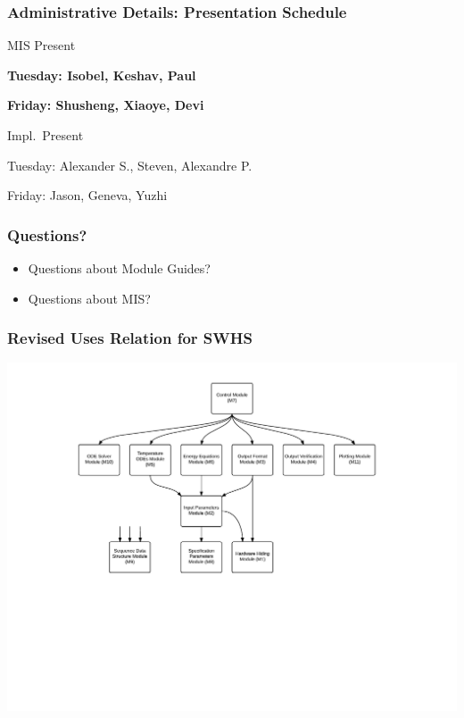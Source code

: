 \documentclass[t,12pt,numbers,fleqn]{beamer}
\begin{document}

\begin{frame}
\frametitle{Administrative Details: Presentation Schedule}

\bi
\item MIS Present
\bi
\item \textbf{Tuesday: Isobel, Keshav, Paul}
\item \textbf{Friday: Shusheng, Xiaoye, Devi}
\ei
\item Impl.\ Present
\bi
\item Tuesday: Alexander S., Steven, Alexandre P.
\item Friday: Jason, Geneva, Yuzhi
\ei

\ei

\end{frame}


\begin{frame}
\frametitle{Questions?}
\begin{itemize}
\item Questions about Module Guides?
\item Questions about MIS?
\end{itemize}
\end{frame}


\begin{frame}

\frametitle{Revised Uses Relation for SWHS}

\begin{center}
\includegraphics[scale=0.58]{../Figures/RevisedHierarchy.pdf}
\end{center}

\end{frame}
\end{document}
